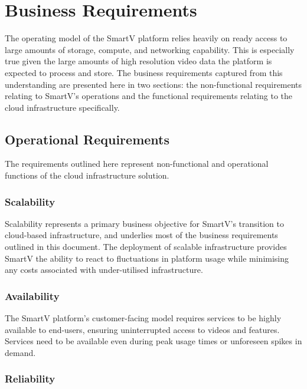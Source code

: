 \section{Business Requirements}\label{sec:businessrequirements}

The operating model of the SmartV platform relies heavily on ready access to large amounts of storage, compute, and networking capability. This is especially true given the large amounts of high resolution video data the platform is expected to process and store. The business requirements captured from this understanding are presented here in two sections: the non-functional requirements relating to SmartV's operations and the functional requirements relating to the cloud infrastructure specifically.

\subsection{Operational Requirements}

The requirements outlined here represent non-functional and operational functions of the cloud infrastructure solution.

\subsubsection*{Scalability}

Scalability represents a primary business objective for SmartV's transition to cloud-based infrastructure, and underlies most of the business requirements outlined in this document. The deployment of scalable infrastructure provides SmartV the ability to react to fluctuations in platform usage while minimising any costs associated with under-utilised infrastructure.

\subsubsection*{Availability}

The SmartV platform's customer-facing model requires services to be highly available to end-users, ensuring uninterrupted access to videos and features. Services need to be available even during peak usage times or unforeseen spikes in demand.


\subsubsection*{Reliability}

